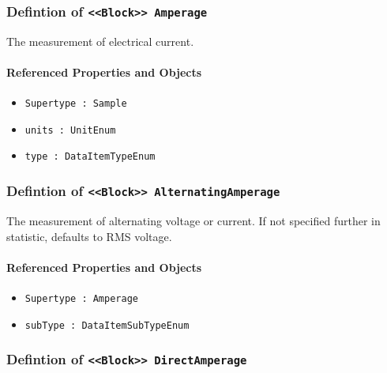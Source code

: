 \subsubsection{Defintion of \texttt{<<Block>> Amperage}}
  \label{type:Amperage}

\FloatBarrier

The measurement of electrical current.

\FloatBarrier
\paragraph{Referenced Properties and Objects}

\begin{itemize}
\item \texttt{Supertype : Sample}

\item \texttt{units : UnitEnum}

\item \texttt{type : DataItemTypeEnum}

\end{itemize}
\FloatBarrier
\subsubsection{Defintion of \texttt{<<Block>> AlternatingAmperage}}
  \label{type:AlternatingAmperage}

\FloatBarrier

The measurement of alternating voltage or current.   If not specified further in statistic, defaults to RMS voltage. 

\FloatBarrier
\paragraph{Referenced Properties and Objects}

\begin{itemize}
\item \texttt{Supertype : Amperage}

\item \texttt{subType : DataItemSubTypeEnum}

\end{itemize}
\FloatBarrier
\subsubsection{Defintion of \texttt{<<Block>> DirectAmperage}}
  \label{type:DirectAmperage}

\FloatBarrier

